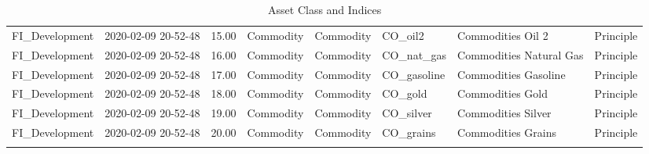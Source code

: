 \begin{longtable}{llrlllll}
  FI\_Development & 2020-02-09 20-52-48 & 15.00 & Commodity & Commodity & CO\_oil2 & Commodities Oil 2 & Principle \\ 
  FI\_Development & 2020-02-09 20-52-48 & 16.00 & Commodity & Commodity & CO\_nat\_gas & Commodities Natural Gas & Principle \\ 
  FI\_Development & 2020-02-09 20-52-48 & 17.00 & Commodity & Commodity & CO\_gasoline & Commodities Gasoline & Principle \\ 
  FI\_Development & 2020-02-09 20-52-48 & 18.00 & Commodity & Commodity & CO\_gold & Commodities Gold & Principle \\ 
  FI\_Development & 2020-02-09 20-52-48 & 19.00 & Commodity & Commodity & CO\_silver & Commodities Silver & Principle \\ 
  FI\_Development & 2020-02-09 20-52-48 & 20.00 & Commodity & Commodity & CO\_grains & Commodities Grains & Principle \\ 
   \hline
\hline
\caption{Asset Class and Indices} 
\end{longtable}
